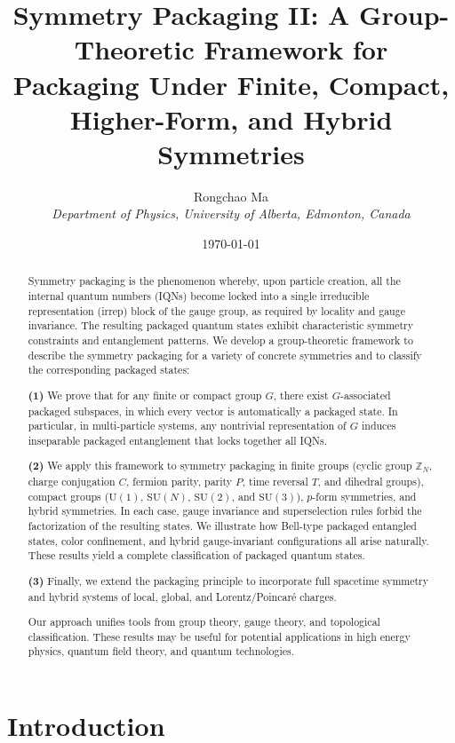 \documentclass[12pt,a4paper]{article}
\title{%
	Symmetry Packaging II:
	A Group-Theoretic Framework for Packaging Under Finite, Compact, Higher-Form, and Hybrid Symmetries
}
\author{
	Rongchao Ma \\
	\textit{Department of Physics, University of Alberta, Edmonton, Canada}
}
\date{\today}
\begin{document}
	
\maketitle

\begin{abstract}
Symmetry packaging is the phenomenon whereby, upon particle creation, all the internal quantum numbers (IQNs) become locked into a single irreducible representation (irrep) block of the gauge group, as required by locality and gauge invariance.
The resulting packaged quantum states exhibit characteristic symmetry constraints and entanglement patterns.
We develop a group-theoretic framework to describe the symmetry packaging for a variety of concrete symmetries and to classify the corresponding packaged states:

\textbf{(1)} We prove that for any finite or compact group $G$, there exist $G$-associated packaged subspaces, in which every vector is automatically a packaged state.
In particular, in multi-particle systems, any nontrivial representation of $G$ induces inseparable packaged entanglement that locks together all IQNs.

\textbf{(2)} We apply this framework to symmetry packaging in finite groups (cyclic group $\mathbb{Z}_N$, charge conjugation $C$, fermion parity, parity $P$, time reversal $T$, and dihedral groups), compact groups ($\mathrm{U}(1)$, $\mathrm{SU}(N)$, $\mathrm{SU}(2)$, and $\mathrm{SU}(3)$), $p$-form symmetries, and hybrid symmetries.
In each case, gauge invariance and superselection rules forbid the factorization of the resulting states.
We illustrate how Bell-type packaged entangled states, color confinement, and hybrid gauge-invariant configurations all arise naturally.
These results yield a complete classification of packaged quantum states. 

\textbf{(3)} Finally, we extend the packaging principle to incorporate full spacetime symmetry and hybrid systems of local, global, and Lorentz/Poincaré charges.

Our approach unifies tools from group theory, gauge theory, and topological classification.
These results may be useful for potential applications in high energy physics, quantum field theory, and quantum technologies.
\end{abstract}


\tableofcontents



\section{Introduction}
\end{document}
